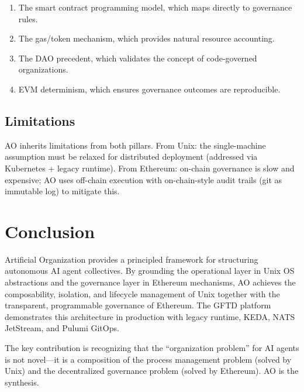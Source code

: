 \documentclass[11pt,a4paper]{article}
\begin{document}
\begin{enumerate}[nosep]
  \item The smart contract programming model, which maps directly to
    governance rules.
  \item The gas/token mechanism, which provides natural resource accounting.
  \item The DAO precedent, which validates the concept of code-governed
    organizations.
  \item EVM determinism, which ensures governance outcomes are reproducible.
\end{enumerate}

\subsection{Limitations}

AO inherits limitations from both pillars. From Unix: the single-machine
assumption must be relaxed for distributed deployment (addressed via
Kubernetes + legacy runtime). From Ethereum: on-chain governance is slow and
expensive; AO uses off-chain execution with on-chain-style audit trails
(git as immutable log) to mitigate this.

\section{Conclusion}

Artificial Organization provides a principled framework for structuring
autonomous AI agent collectives. By grounding the operational layer in
Unix OS abstractions and the governance layer in Ethereum mechanisms, AO
achieves the composability, isolation, and lifecycle management of Unix
together with the transparent, programmable governance of Ethereum. The
GFTD platform demonstrates this architecture in production with legacy runtime,
KEDA, NATS JetStream, and Pulumi GitOps.

The key contribution is recognizing that the ``organization problem'' for
AI agents is not novel---it is a composition of the process management
problem (solved by Unix) and the decentralized governance problem (solved
by Ethereum). AO is the synthesis.
\end{document}

